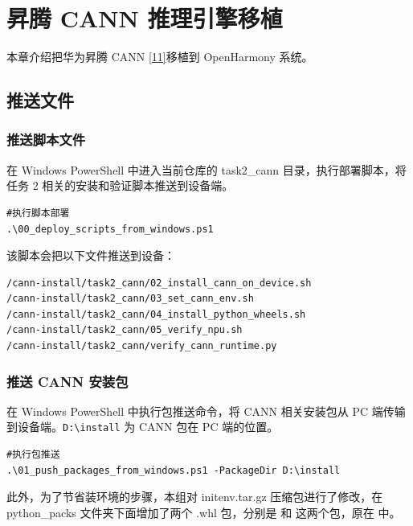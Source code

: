
\chapter{昇腾 CANN 推理引擎移植}

本章介绍把华为昇腾 CANN \hyperref[ref:cann-doc]{[11]}移植到 OpenHarmony 系统。

\section{推送文件}

\subsection{推送脚本文件}
在 Windows PowerShell 中进入当前仓库的 task2\_cann 目录，执行部署脚本，将任务 2 相关的安装和验证脚本推送到设备端。

\begin{lstlisting}[style=shell, caption={执行脚本部署}]
#执行脚本部署
.\00_deploy_scripts_from_windows.ps1
\end{lstlisting}

该脚本会把以下文件推送到设备：

\begin{lstlisting}[caption={推送的脚本文件}]
/cann-install/task2_cann/02_install_cann_on_device.sh
/cann-install/task2_cann/03_set_cann_env.sh
/cann-install/task2_cann/04_install_python_wheels.sh
/cann-install/task2_cann/05_verify_npu.sh
/cann-install/task2_cann/verify_cann_runtime.py
\end{lstlisting}


\subsection{推送 CANN 安装包}

在 Windows PowerShell 中执行包推送命令，将 CANN 相关安装包从 PC 端传输到设备端。\texttt{D:\textbackslash install} 为 CANN 包在 PC 端的位置。

\begin{lstlisting}[style=shell, caption={执行包推送}]
#执行包推送
.\01_push_packages_from_windows.ps1 -PackageDir D:\install
\end{lstlisting}

此外，为了节省装环境的步骤，本组对 initenv.tar.gz 压缩包进行了修改，在 python\_packs 文件夹下面增加了两个 .whl 包，分别是  和  这两个包，原在  中。

